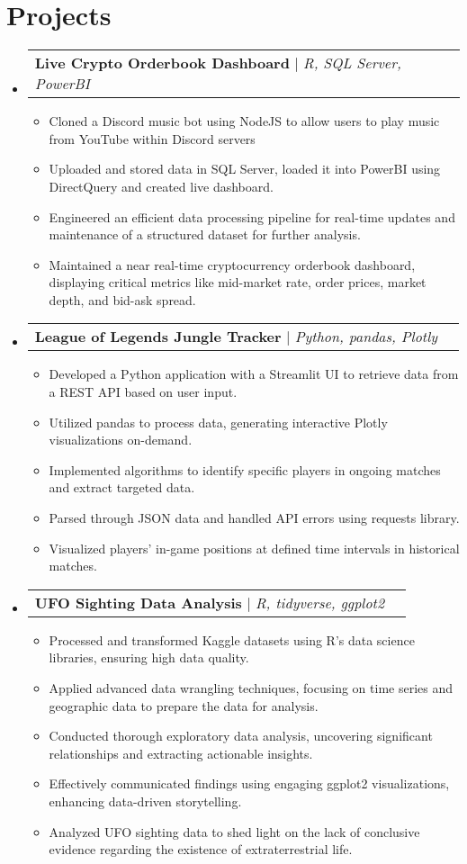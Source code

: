 \documentclass[letterpaper,11pt]{article}
\makeatletter
\newcommand{\resumeItem}[1]{
  \item\small{
    {#1 \vspace{-2pt}}
  }
}
\newcommand{\resumeProjectHeading}[2]{
    \item
    \begin{tabular*}{0.97\textwidth}{l@{\extracolsep{\fill}}r}
      \small#1 & #2 \\
    \end{tabular*}\vspace{-7pt}
}
\newcommand{\resumeSubHeadingListStart}{\begin{itemize}[leftmargin=0.15in, label={}]}
\newcommand{\resumeSubHeadingListEnd}{\end{itemize}}
\newcommand{\resumeItemListStart}{\begin{itemize}}
\newcommand{\resumeItemListEnd}{\end{itemize}\vspace{-5pt}}
\makeatother
\begin{document}
\section{Projects}
\resumeSubHeadingListStart
    \resumeProjectHeading
        {\textbf{Live Crypto Orderbook Dashboard} $|$ \emph{R, SQL Server, PowerBI}}{}
        \resumeItemListStart
            \resumeItem{Cloned a Discord music bot using NodeJS to allow users to play music from YouTube within Discord servers}
            \resumeItem{Uploaded and stored data in SQL Server, loaded it into PowerBI using DirectQuery and created live dashboard.}
            \resumeItem{Engineered an efficient data processing pipeline for real-time updates and maintenance of a structured dataset for further analysis.}
            \resumeItem{Maintained a near real-time cryptocurrency orderbook dashboard, displaying critical metrics like mid-market rate, order prices, market depth, and bid-ask spread.}
        \resumeItemListEnd
        \resumeProjectHeading
        {\textbf{League of Legends Jungle Tracker} $|$ \emph{Python, pandas, Plotly}}{}
        \resumeItemListStart
            \resumeItem{Developed a Python application with a Streamlit UI to retrieve data from a REST API based on user input.}
            \resumeItem{Utilized pandas to process data, generating interactive Plotly visualizations on-demand.}
            \resumeItem{Implemented algorithms to identify specific players in ongoing matches and extract targeted data.}
            \resumeItem{Parsed through JSON data and handled API errors using requests library.}
            \resumeItem{Visualized players' in-game positions at defined time intervals in historical matches.}
        \resumeItemListEnd
    \resumeProjectHeading
        {\textbf{UFO Sighting Data Analysis} $|$ \emph{R, tidyverse, ggplot2}}{}
        \resumeItemListStart
            \resumeItem{Processed and transformed Kaggle datasets using R's data science libraries, ensuring high data quality.}
            \resumeItem{Applied advanced data wrangling techniques, focusing on time series and geographic data to prepare the data for analysis.}
            \resumeItem{Conducted thorough exploratory data analysis, uncovering significant relationships and extracting actionable insights.}
            \resumeItem{Effectively communicated findings using engaging ggplot2 visualizations, enhancing data-driven storytelling.}
            \resumeItem{Analyzed UFO sighting data to shed light on the lack of conclusive evidence regarding the existence of extraterrestrial life.}
        \resumeItemListEnd
\resumeSubHeadingListEnd
\end{document}
